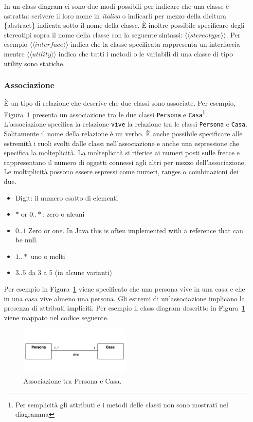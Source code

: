 \documentclass{article}
\begin{document}
In un class diagram ci sono due modi possibili per indicare che una classe \`e astratta: scrivere il loro nome in \textit{italico} o indicarli per mezzo della dicitura   \{abstract\} indicata sotto il nome della classe.
\`E inoltre possibile specificare degli stereotipi sopra il nome della classe con la seguente sintassi: $\langle \langle stereotype \rangle \rangle$. Per esempio $\langle \langle interface \rangle \rangle$ indica che la classe specificata rappresenta un interfaccia mentre 
$\langle \langle utility \rangle \rangle$ indica che tutti i metodi o le variabili di una classe di tipo utility sono statiche.

\subsubsection{Associazione} 
\`E un tipo di relazione che descrive che due classi sono associate. Per esempio, Figura~\ref{Fig:Associazione} presenta un associazione tra le due classi \texttt{Persona} e \texttt{Casa}\footnote{Per semplicit\`a gli attributi e i metodi delle classi non sono mostrati nel diagramma}. 
L'associazione specifica la relazione \texttt{vive} la relazione tra le classi  \texttt{Persona} e \texttt{Casa}.  Solitamente il nome della relazione \`e un verbo. \`E anche possibile specificare alle estremit\`a i ruoli svolti dalle classi nell'associazione e anche una espressione che specifica la molteplicit\`a. La molteplicit\`a si riferice ai numeri posti sulle frecce e rappresentano il numero di oggetti connessi agli altri per mezzo dell'associazione. Le moltiplicit\`a possono essere espressi come numeri, ranges o combinazioni dei due.
\begin{itemize}
\item Digit: il numero esatto di elementi
\item $*$ or $0..*$: zero o alcuni
\item $0..1$ Zero or one. In Java this is often implemented with a reference that can be null.
\item $1..*$ uno o molti
\item $3..5$ da 3 a 5 (in alcune varianti)
\end{itemize}
Per esempio in Figura~\ref{Fig:Associazione} viene specificato che una persona vive in una casa e che in una casa vive almeno una persona.
Gli estremi di un'associazione implicano la presenza di attributi impliciti. Per esempio il class diagram descritto in Figura~\ref{Fig:Associazione} viene mappato nel codice seguente.
\begin{figure}[h!]
  \centering
    \includegraphics[width=0.5\textwidth]{Img/Associazione.pdf}
      \caption{Associazione tra Persona e Casa.}
      \label{Fig:Associazione}
\end{figure}
\end{document}
